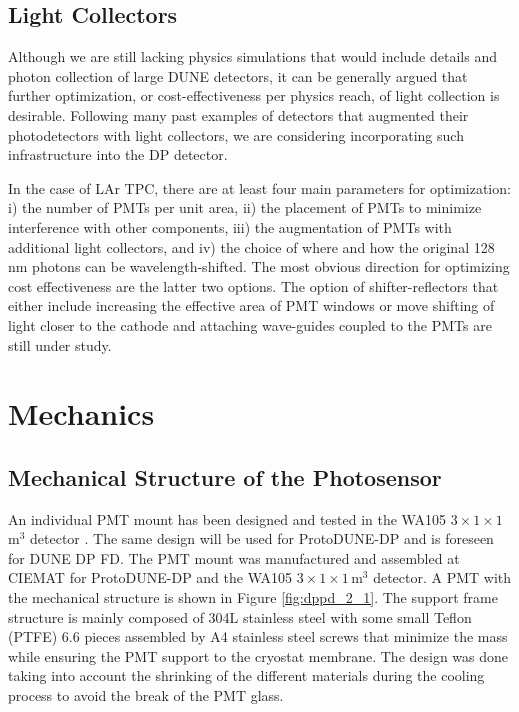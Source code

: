 \subsection{Light Collectors}
\label{sec:fddp-pd-2.5}

Although we are still lacking physics simulations that would include details and photon collection of large DUNE detectors, it can be generally argued that further optimization, or cost-effectiveness per physics reach, of light collection is desirable. Following many past examples of detectors that augmented their photodetectors with light collectors, we are considering incorporating such infrastructure into the DP detector.

In the case of LAr TPC, there are at least four main parameters for optimization: i) the number of PMTs per unit area, ii) the placement of PMTs to minimize interference with other components, iii) the augmentation of PMTs with additional light collectors, and iv) the choice of where and how the original 128\,nm photons can be wavelength-shifted. The most obvious direction for optimizing cost effectiveness are the latter two options. The option of shifter-reflectors that either include increasing the effective area of PMT windows or move shifting of light closer to the cathode and attaching wave-guides coupled to the PMTs are still under study.

\section{Mechanics}
\label{sec:fddp-pd-3}

\subsection{Mechanical Structure of the Photosensor}
\label{sec:fddp-pd-3.1}

An individual PMT mount has been designed and tested in the WA105 $3\times1\times1$\,m$^3$ detector \cite{Zambelli:2017dkg}. The same design will be used for ProtoDUNE-DP and is foreseen for DUNE DP FD. The PMT mount was manufactured and assembled at CIEMAT for ProtoDUNE-DP and the WA105 $3\times1\times1$\,m$^3$ detector. A PMT with the mechanical structure is shown in Figure \ref{fig:dppd_2_1}. The support frame structure is mainly composed of 304L stainless steel with some small Teflon (PTFE) 6.6 pieces assembled by A4 stainless steel screws that minimize the mass while ensuring the PMT support to the cryostat membrane. The design was done taking into account the shrinking of the different materials during the cooling process to avoid the break of the PMT glass.


